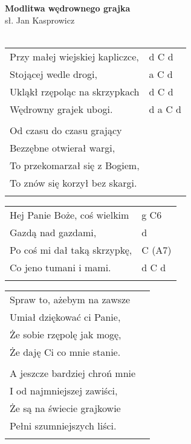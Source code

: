 \documentclass[a5paper]{article}
\begin{document}


\noindent
\fontsize{12pt}{15pt}\selectfont
\textbf{Modlitwa wędrownego grajka} \\
\fontsize{8pt}{10pt}\selectfont
sł. Jan Kasprowicz \\ \\
\fontsize{10pt}{12pt}\selectfont
{}
\begin{tabular}{@{}p{7.50cm}p{3cm}@{}}
\noindent
Przy małej wiejskiej kapliczce, & d C d \\
Stojącej wedle drogi, & a C d \\
Ukląkł rzępoląc na skrzypkach & d C d \\
Wędrowny grajek ubogi. & d a C d \\ \\

Od czasu do czasu grający \\
Bezzębne otwierał wargi, \\
To przekomarzał się z Bogiem, \\
To znów się korzył bez skargi. \\ \\
\end{tabular}

\noindent
\begin{tabular}{@{}p{6.50cm}p{3cm}@{}}
Hej Panie Boże, coś wielkim & g C6 \\
Gazdą nad gazdami, & d \\
Po coś mi dał taką skrzypkę, & C (A7) \\
Co jeno tumani i mami. & d C d \\ \\
\end{tabular}

\noindent
\begin{tabular}{@{}p{7.50cm}p{3cm}@{}}
Spraw to, ażebym na zawsze \\
Umiał dziękować ci Panie, \\
Że sobie rzępolę jak mogę, \\
Że daję Ci co mnie stanie. \\ \\

A jeszcze bardziej chroń mnie \\
I od najmniejszej zawiści, \\
Że są na świecie grajkowie \\
Pełni szumniejszych liści. \\ \\
\end{tabular}
\end{document}
